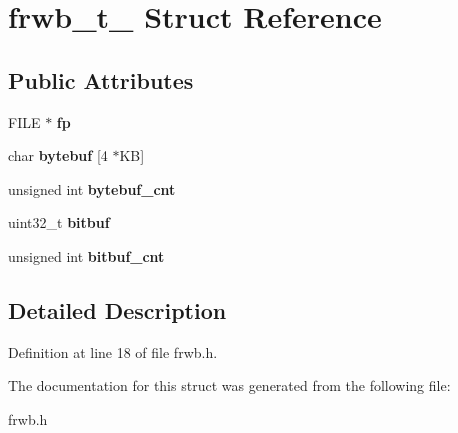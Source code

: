 \hypertarget{structfrwb__t__}{\section{frwb\-\_\-t\-\_\- Struct Reference}
\label{structfrwb__t__}
}
\subsection*{Public Attributes}
\begin{DoxyCompactItemize}
\item 
\hypertarget{structfrwb__t___acbd988fae374db9004f84bddff971faf}{F\-I\-L\-E $\ast$ {\bfseries fp}}\label{structfrwb__t___acbd988fae374db9004f84bddff971faf}

\item 
\hypertarget{structfrwb__t___a61877bf13c68c64df05eec2ed79b7699}{char {\bfseries bytebuf} \mbox{[}4 $\ast$K\-B\mbox{]}}\label{structfrwb__t___a61877bf13c68c64df05eec2ed79b7699}

\item 
\hypertarget{structfrwb__t___aed046fcb666aa20ad2cd18fb1cbb34ce}{unsigned int {\bfseries bytebuf\-\_\-cnt}}\label{structfrwb__t___aed046fcb666aa20ad2cd18fb1cbb34ce}

\item 
\hypertarget{structfrwb__t___a562d8da15cf9ee7ec5fed1d890500dd1}{uint32\-\_\-t {\bfseries bitbuf}}\label{structfrwb__t___a562d8da15cf9ee7ec5fed1d890500dd1}

\item 
\hypertarget{structfrwb__t___afd868a92ee686d1334c50e4cb9633567}{unsigned int {\bfseries bitbuf\-\_\-cnt}}\label{structfrwb__t___afd868a92ee686d1334c50e4cb9633567}

\end{DoxyCompactItemize}


\subsection{Detailed Description}


Definition at line 18 of file frwb.\-h.



The documentation for this struct was generated from the following file\-:\begin{DoxyCompactItemize}
\item 
frwb.\-h\end{DoxyCompactItemize}
